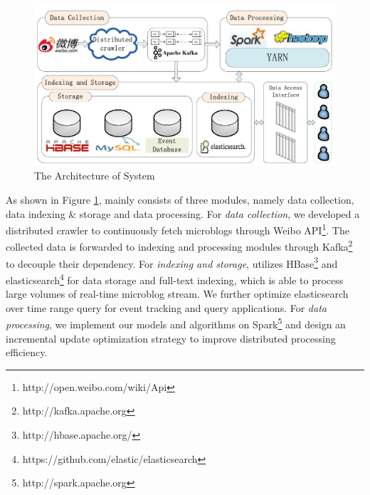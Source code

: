 

\begin{figure}[!t]
\centering
\includegraphics[scale=0.47]{system_architecture.pdf}
\centering
\caption{The Architecture of \ring System}
\label{fig:system_architecture}
\end{figure}

As shown in Figure \ref{fig:system_architecture},
\ring mainly consists of three modules, namely data collection, data indexing \& storage and data processing.
For \emph{data collection}, we developed a distributed crawler to continuously fetch microblogs through Weibo API\footnote{http://open.weibo.com/wiki/Api}.
The collected data is forwarded to indexing and processing modules through Kafka\footnote{http://kafka.apache.org} to decouple their dependency.
For \emph{indexing and storage}, \ring utilizes HBase\footnote{http://hbase.apache.org/} and elasticsearch\footnote{https://github.com/elastic/elasticsearch} for data storage and full-text indexing, which is able to process large volumes of real-time microblog stream.
We further optimize elasticsearch over time range query for event tracking and query applications.
For \emph{data processing}, we implement our models and algorithms on Spark\footnote{http://spark.apache.org} and
 design an incremental update optimization strategy to improve distributed processing efficiency.
